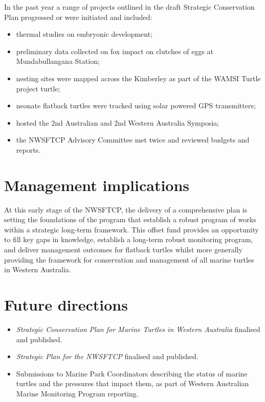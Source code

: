 \documentclass[version=last,
    paper=a4, %
    10pt, %
    usenames,
    dvipsnames,
    oneside, %
    headings=openany, %
    DIV=15 %
]{scrbook}
\begin{document}
In the past year a range of projects outlined in the draft Strategic
Conservation Plan progressed or were initiated and included:

\begin{itemize}
\itemsep1pt\parskip0pt
\item
  thermal studies on embryonic development;
\item
  preliminary data collected on fox impact on clutches of eggs at
  Mundabullangana Station;
\item
  nesting sites were mapped across the Kimberley as part of the WAMSI
  Turtle project turtle;
\item
  neonate flatback turtles were tracked using solar powered GPS
  transmitters;
\item
  hosted the 2nd Australian and 2nd Western Australia Symposia;
\item
  the NWSFTCP Advisory Committee met twice and reviewed budgets and
  reports.
\end{itemize}




\section*{Management implications}

At this early stage of the NWSFTCP, the delivery of a comprehensive plan
is setting the foundations of the program that establish a robust
program of works within a strategic long-term framework. This offset
fund provides an opportunity to fill key gaps in knowledge, establish a
long-term robust monitoring program, and deliver management outcomes for
flatback turtles whilst more generally providing the framework for
conservation and management of all marine turtles in Western Australia.




\section*{Future directions}

\begin{itemize}
\itemsep1pt\parskip0pt
\item
  \emph{Strategic Conservation} \emph{Plan for Marine Turtles in Western
  Australia} finalised and published.
\item
  \emph{Strategic Plan for the NWSFTCP} finalised and published.
\item
  Submissions to Marine Park Coordinators describing the status of
  marine turtles and the pressures that impact them, as part of Western
  Australian Marine Monitoring Program reporting.
\end{itemize}



\end{document}
